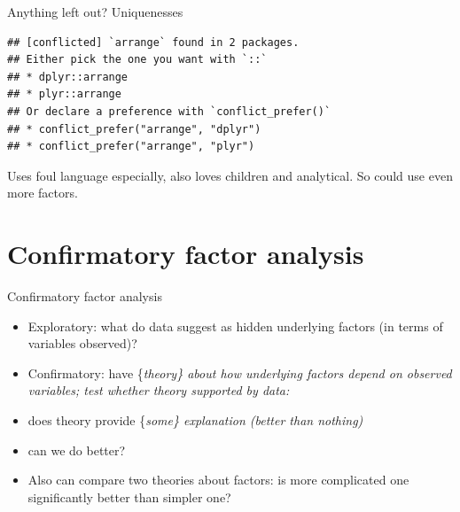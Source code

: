 \documentclass[ignorenonframetext,]{beamer}
\newenvironment{Shaded}{\begin{snugshade}}{\end{snugshade}}
\newcommand{\DataTypeTok}[1]{\textcolor[rgb]{0.13,0.29,0.53}{#1}}
\newcommand{\DecValTok}[1]{\textcolor[rgb]{0.00,0.00,0.81}{#1}}
\newcommand{\FloatTok}[1]{\textcolor[rgb]{0.00,0.00,0.81}{#1}}
\newcommand{\KeywordTok}[1]{\textcolor[rgb]{0.13,0.29,0.53}{\textbf{#1}}}
\newcommand{\NormalTok}[1]{#1}
\newcommand{\OperatorTok}[1]{\textcolor[rgb]{0.81,0.36,0.00}{\textbf{#1}}}
\newcommand{\StringTok}[1]{\textcolor[rgb]{0.31,0.60,0.02}{#1}}
\begin{document}
\begin{frame}[fragile]{Anything left out? Uniquenesses}
\protect\hypertarget{anything-left-out-uniquenesses}{}

\begin{Shaded}
\end{Shaded}

\begin{verbatim}
## [conflicted] `arrange` found in 2 packages.
## Either pick the one you want with `::` 
## * dplyr::arrange
## * plyr::arrange
## Or declare a preference with `conflict_prefer()`
## * conflict_prefer("arrange", "dplyr")
## * conflict_prefer("arrange", "plyr")
\end{verbatim}

Uses foul language especially, also loves children and analytical. So
could use even more factors.

\section{Confirmatory factor analysis}
\frame{\sectionpage}

\end{frame}

\begin{frame}{Confirmatory factor analysis}
\protect\hypertarget{confirmatory-factor-analysis}{}

\begin{itemize}
\item
  Exploratory: what do data suggest as hidden underlying factors (in
  terms of variables observed)?
\item
  Confirmatory: have \{\em theory\} about how underlying factors depend
  on observed variables; test whether theory supported by data:
\item
  does theory provide \{\em some\} explanation (better than nothing)
\item
  can we do better?
\item
  Also can compare two theories about factors: is more complicated one
  significantly better than simpler one?
\end{itemize}

\end{frame}
\end{document}
